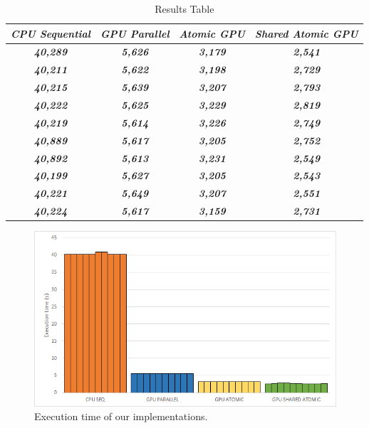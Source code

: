 \documentclass[conference]{IEEEtran}
\begin{document}
\begin{table}[htbp]
	\caption{Results Table} %
	\begin{center}
		\begin{tabular}{|c|c|c|c|}
		\hline
			\textbf{\textit{CPU Sequential}} & \textbf{\textit{GPU Parallel}} & \textbf{\textit{Atomic GPU}} & \textbf{\textit{Shared Atomic GPU}} \\ \hline
			\textbf{\textit{40,289}} & \textbf{\textit{5,626}} & \textbf{\textit{3,179}} & \textbf{\textit{2,541}} \\ \hline
			\textbf{\textit{40,211}} & \textbf{\textit{5,622}} & \textbf{\textit{3,198}} & \textbf{\textit{2,729}} \\ \hline
			\textbf{\textit{40,215}} & \textbf{\textit{5,639}} & \textbf{\textit{3,207}} & \textbf{\textit{2,793}} \\ \hline
			\textbf{\textit{40,222}} & \textbf{\textit{5,625}} & \textbf{\textit{3,229}} & \textbf{\textit{2,819}} \\ \hline
			\textbf{\textit{40,219}} & \textbf{\textit{5,614}} & \textbf{\textit{3,226}} & \textbf{\textit{2,749}} \\ \hline
			\textbf{\textit{40,889}} & \textbf{\textit{5,617}} & \textbf{\textit{3,205}} & \textbf{\textit{2,752}} \\ \hline
			\textbf{\textit{40,892}} & \textbf{\textit{5,613}} & \textbf{\textit{3,231}} & \textbf{\textit{2,549}} \\ \hline
			\textbf{\textit{40,199}} & \textbf{\textit{5,627}} & \textbf{\textit{3,205}} & \textbf{\textit{2,543}} \\ \hline
			\textbf{\textit{40,221}} & \textbf{\textit{5,649}} & \textbf{\textit{3,207}} & \textbf{\textit{2,551}} \\ \hline
			\textbf{\textit{40,224}} & \textbf{\textit{5,617}} & \textbf{\textit{3,159}} & \textbf{\textit{2,731}} \\ \hline
	\end{tabular}
	\label{tab2}
	\end{center}
\end{table}

\begin{figure}[htbp]
	\centerline{\includegraphics[width=\linewidth]{figures/graph_results.png}}
	\caption{Execution time of our implementations.}
	\label{fig1}
\end{figure}
\end{document}
